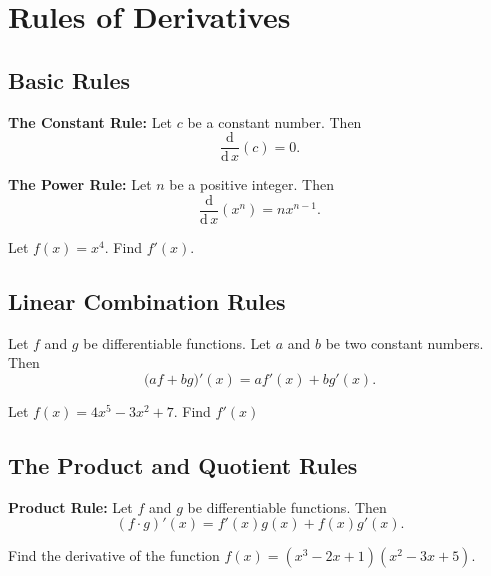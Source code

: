 
\hypertarget{rules-of-derivatives}{%
\section{Rules of Derivatives}\label{rules-of-derivatives}}

\hypertarget{basic-rules}{%
\subsection{Basic Rules}\label{basic-rules}}

\textbf{The Constant Rule:} Let \(c\) be a constant number. Then
\[\frac{\mathrm{d}}{\mathrm{d}\,x}(c)=0.\]

\textbf{The Power Rule:} Let \(n\) be a positive integer. Then
\[\dfrac{\mathrm{d}}{\mathrm{d}\,x}\left(x^n\right)=nx^{n-1}.\]

\begin{example}
Let \(f(x)=x^4\). Find \(f'(x)\).
\end{example}
\vspace*{6\baselineskip}

\hypertarget{linear-combination-rules}{%
\subsection{Linear Combination Rules}\label{linear-combination-rules}}

Let \(f\) and \(g\) be differentiable functions. Let \(a\) and \(b\) be
two constant numbers. Then \[\big(af+bg\big)'(x)=af'(x)+bg'(x).\]

\begin{example}
Let \(f(x)=4x^5-3x^2+7\). Find \(f'(x)\)
\end{example}
\vspace*{6\baselineskip}

\hypertarget{the-product-and-quotient-rules}{%
\subsection{The Product and Quotient
Rules}\label{the-product-and-quotient-rules}}

\textbf{Product Rule:} Let \(f\) and \(g\) be differentiable
functions. Then \[
(f\cdot g)'(x)=f'(x)g(x)+f(x)g'(x).
\]


\begin{example}
Find the derivative of the function \(f(x)=(x^3-2x+1)(x^2-3x+5)\).
\end{example}
\vspace*{6\baselineskip}

